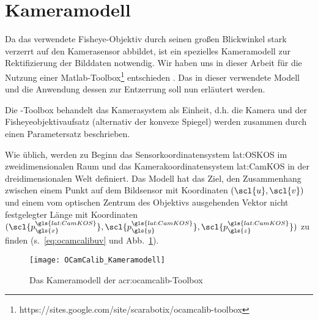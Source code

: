 \section{Kameramodell \dcsecondauthorshort} \label{sec:kameramodell}
Da das verwendete Fisheye-Objektiv durch seinen großen Blickwinkel stark verzerrt auf den Kamerasensor abbildet, ist ein spezielles Kameramodell zur Rektifizierung der Bilddaten notwendig. Wir haben uns in dieser Arbeit für die Nutzung einer Matlab-Toolbox\footnote{https://sites.google.com/site/scarabotix/ocamcalib-toolbox} entschieden  \autocite{scaramuzzaFlexibleTechniqueAccurate2006, scaramuzzaToolboxEasilyCalibrating2006, scaramuzzaOmnidirectionalVisionCalibration2007, rufliAutomaticDetectionCheckerboards2008}. Das in dieser verwendete Modell und die Anwendung dessen zur Entzerrung soll nun erläutert werden. 

Die -Toolbox behandelt das Kamerasystem als Einheit, d.h. die Kamera und der Fisheyeobjektivaufsatz (alternativ der konvexe Spiegel) werden zusammen durch einen Parametersatz beschrieben.

Wie üblich, werden zu Beginn das Sensorkoordinatensystem \gls{lat:OSKOS} im zweidimensionalen Raum und das Kamerakoordinatensystem \gls{lat:CamKOS} in der dreidimensionalen Welt definiert. Das Modell hat das Ziel, den Zusammenhang zwischen einem Punkt auf dem Bildsensor  mit Koordinaten \((\scl{u}, \scl{v})\) und einem vom optischen Zentrum des Objektivs ausgehenden Vektor nicht festgelegter Länge  mit Koordinaten \((\scl{p^{\gls{lat:CamKOS}}_{\gls{x}}}, \scl{p^{\gls{lat:CamKOS}}_{\gls{y}}}, \scl{p^{\gls{lat:CamKOS}}_{\gls{z}}})\) zu finden (s.~\eqref{eq:ocamcalibuv} und Abb.~\ref{fig:kameramodell}).

\begin{figure}[htbp]
  \centering
  \texttt{[image: OCamCalib\_Kameramodell]}
  \caption{Das Kameramodell der \gls{acr:ocamcalib}-Toolbox}
  \label{fig:kameramodell}
\end{figure}

